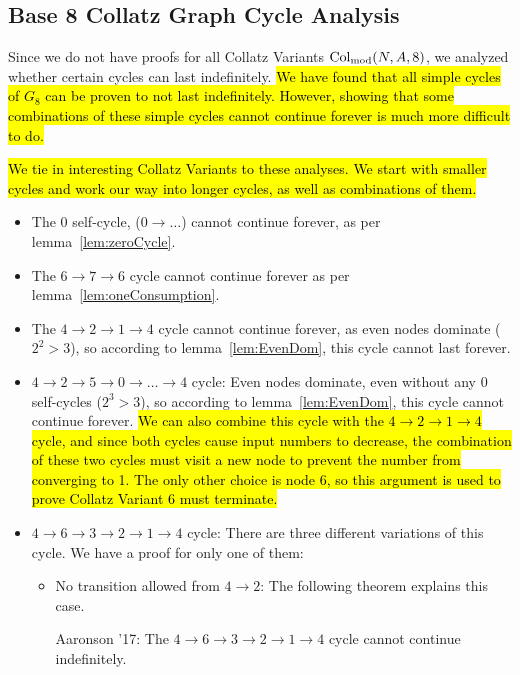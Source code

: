 \subsection{Base 8 Collatz Graph Cycle Analysis} \label{subsubsec:cycleanalysis}
Since we do not have proofs for all Collatz Variants $\mathrm{Col}_{\text{mod}}(N,A,8)$, we analyzed whether certain cycles can last indefinitely. \hl{We have found that all simple cycles of $G_8$ can be proven to not last indefinitely. However, showing that some combinations of these simple cycles cannot continue forever is much more difficult to do.}\par
\hl{We tie in interesting Collatz Variants to these analyses. We start with smaller cycles and work our way into longer cycles, as well as combinations of them.}
\begin{itemize}
    \item The 0 self-cycle, ($0  \rightarrow \ldots$) cannot continue forever, as per lemma~\ref{lem:zeroCycle}.
    \item The $6 \rightarrow 7 \rightarrow 6$ cycle cannot continue forever as per lemma~\ref{lem:oneConsumption}.
    \item The $4 \rightarrow 2 \rightarrow 1 \rightarrow 4$ cycle cannot continue forever, as even nodes dominate ($2^2 > 3$), so according to lemma~\ref{lem:EvenDom}, this cycle cannot last forever.
    \item $4 \rightarrow 2 \rightarrow 5 \rightarrow 0  \rightarrow \ldots \rightarrow 4$ cycle:  Even nodes dominate, even without any 0 self-cycles ($2^3 > 3$), so according to lemma~\ref{lem:EvenDom}, this cycle cannot continue forever. \hl{We can also combine this cycle with the $4 \rightarrow 2 \rightarrow 1 \rightarrow 4$ cycle, and since both cycles cause input numbers to decrease, the combination of these two cycles must visit a new node to prevent the number from converging to 1. The only other choice is node 6, so this argument is used to prove Collatz Variant 6 must terminate.}
    \item $4 \rightarrow 6 \rightarrow 3 \rightarrow 2 \rightarrow 1 \rightarrow 4$ cycle: There are three different variations of this cycle. We have a proof for only one of them:
\begin{itemize}
  \item No transition allowed from $4 \rightarrow 2$: The following theorem explains this case.
  \begin{theorem} Aaronson '17: The $4 \rightarrow 6 \rightarrow 3 \rightarrow 2 \rightarrow 1 \rightarrow 4$ cycle cannot continue indefinitely.

\end{theorem}
\end{itemize}
\end{itemize}

